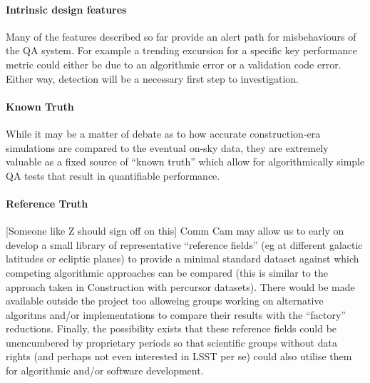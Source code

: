 \paragraph{Intrinsic design features}

Many of the features described so far provide an alert path for misbehaviours of the QA system. For example a trending excursion for a specific key performance metric could either be due to an algorithmic error or a validation code error. Either way, detection will be a necessary first step to investigation.

\paragraph{Known Truth}

While it may be a matter of debate as to how accurate construction-era
simulations are compared to the eventual on-sky data, they are extremely valuable as a fixed source of ``known truth'' which allow for algorithmically simple QA tests that result in quantifiable performance.

\paragraph{Reference Truth}

[Someone like Z should sign off on this] Comm Cam may allow us to early on develop a small library of representative ``reference fields'' (eg at different galactic latitudes or ecliptic planes) to provide a minimal standard dataset against which competing algorithmic approaches can be compared (this is similar to the approach taken in Construction with percursor datasets). There would be made available outside the project too alloweing groups working on alternative algoritms and/or implementations to compare their results with the ``factory'' reductions. Finally, the possibility exists that these reference fields could be unencumbered by proprietary periods so that scientific groups without data rights (and perhaps not even interested in LSST per se) could also utilise them for algorithmic and/or software development.
